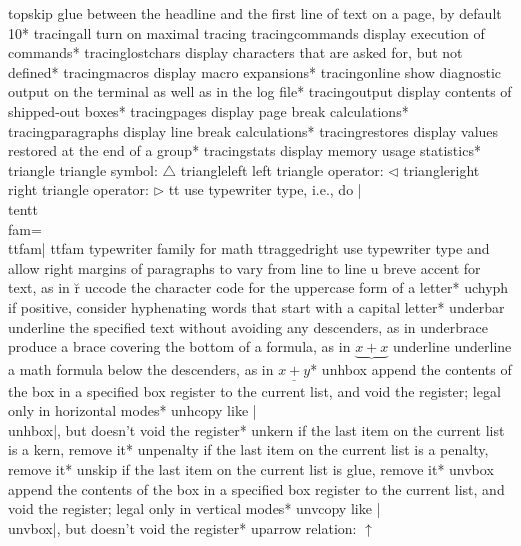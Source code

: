 \capcs topskip {glue between the headline and the first line of text
   on a page, by default 10\pt}*{}
\capcs tracingall {turn on maximal tracing}{}{}
\capcs tracingcommands {display execution of commands}*{}
\capcs tracinglostchars {display characters that are asked for, but not
   defined}*{}
\capcs tracingmacros {display macro expansions}*{}
\capcs tracingonline {show diagnostic output on the terminal as well as in
   the log file}*{}
\capcs tracingoutput {display contents of shipped-out boxes}*{}
\capcs tracingpages {display page break calculations}*{}
\capcs tracingparagraphs {display line break calculations}*{}
\capcs tracingrestores {display values restored at the end
   of a group}*{}
\capcs tracingstats {display memory usage statistics}*{}
\capcs triangle {triangle symbol: $\triangle$}{}{}
\capcs triangleleft {left triangle operator: $\triangleleft$}{}{}
\capcs triangleright {right triangle operator: $\triangleright$}{}{}
\capcs tt {use typewriter type, i.e., do |\\tentt\\fam=\\ttfam|}{}{}
\capcs ttfam {typewriter family for math}{}{}
\capcs ttraggedright {use typewriter type and allow right margins of
   paragraphs to vary from line to line}{}{}
\capcs u {breve accent for text, as in \u r}{}{}
\capcs uccode {the character code for the uppercase form of a letter}*{}
\capcs uchyph {if positive, consider hyphenating words that start with a
   capital letter}*{}
\capcs underbar {underline the specified text without avoiding
   any descenders, as in }{}{}
\capcs underbrace {produce a brace covering the bottom of a formula, as in
   $\underbrace{x+x}{}$}{}{}
\capcs underline {underline a math formula below the descenders, as in
   $\underline{x+y}$}*{}
\capcs unhbox {append the contents of the box
   in a specified box
   register to the current list, and void the register; legal only in
   horizontal modes}*{}
\capcs unhcopy {like |\\unhbox|, but doesn't void the register}*{}
\capcs unkern {if the last item on the current list is a kern, remove it}*{}
\capcs unpenalty {if the last item on the current list is a penalty, remove
   it}*{}
\capcs unskip {if the last item on the current list is glue, remove it}*{}
\capcs unvbox {append the contents of the box
   in a specified box
   register to the current list, and void the register; legal only in
   vertical modes}*{}
\capcs unvcopy {like |\\unvbox|, but doesn't void the register}*{}
\capcs uparrow {relation: $\uparrow$}{}{}
